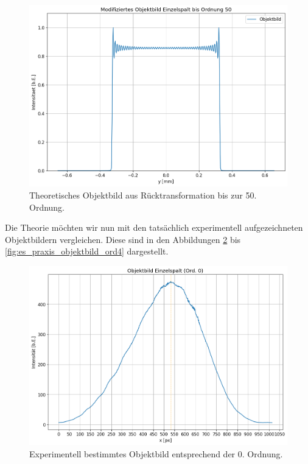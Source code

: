 \begin{figure}[H]
  \centering
  \includegraphics[width=.9\textwidth]{files/plots/4/es_theorie_objektbild_ord50.png}
  \caption{Theoretisches Objektbild aus Rücktransformation bis zur 50. Ordnung.}
  \label{fig:es_theorie_objektbild_ord50}
\end{figure}

Die Theorie möchten wir nun mit den tatsächlich experimentell aufgezeichneten Objektbildern vergleichen. Diese sind in den Abbildungen \ref{fig:es_praxis_objektbild_ord0} bis \ref{fig:es_praxis_objektbild_ord4} dargestellt.

\begin{figure}[H]
  \centering
  \includegraphics[width=.9\textwidth]{files/plots/4/es_praxis_objektbild_ord0.png}
  \caption{Experimentell bestimmtes Objektbild entsprechend der 0. Ordnung.}
  \label{fig:es_praxis_objektbild_ord0}
\end{figure}

